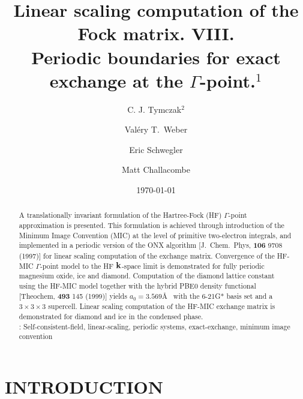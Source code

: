 \commentoutA{\documentclass[prb,aps,nobibnotes,twocolumn,doublespace,twocolumngrid,superbib,showpacs]{revtex4}}
\begin{document}
\title{Linear scaling computation of the Fock matrix.  VIII. \\  
       Periodic boundaries for exact exchange at the $\Gamma$-point.$^1$ }

\author{C. J. Tymczak$^2$}
\author{Val{\'e}ry T.~Weber}
\author{Eric Schwegler}
\author{Matt Challacombe}

\date{\today}
\begin{abstract}
A translationally invariant formulation of the Hartree-Fock (HF) $\Gamma$-point approximation
is presented.   This formulation is achieved through introduction of  the  Minimum Image Convention (MIC) at 
the level of primitive two-electron integrals, and implemented in a periodic version of the 
ONX algorithm [J.~Chem.~Phys, {\bf 106} 9708 (1997)] for linear scaling computation of the
exchange matrix. Convergence of the HF-MIC $\Gamma$-point model to the HF ${\bf k}$-space limit 
is demonstrated for fully periodic magnesium oxide, ice and diamond.  Computation of the diamond
lattice constant using the HF-MIC model together with the hybrid PBE0 density functional 
[Theochem, {\bf 493} 145 (1999)] yields $a_0=3.569$\AA~ with the 6-21G* basis set and a 
$3\times3\times3$ supercell.  Linear scaling computation of the HF-MIC exchange matrix is demonstrated 
for diamond and ice in the condensed phase.
\\ \smallskip
{}: Self-consistent-field, linear-scaling, periodic systems, exact-exchange, minimum image convention
\end{abstract}


\maketitle


\section{INTRODUCTION}
\end{document}
